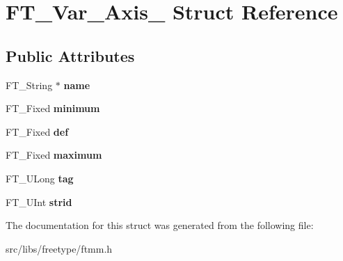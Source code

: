 \hypertarget{struct_f_t___var___axis__}{
\section{FT\_\-Var\_\-Axis\_\- Struct Reference}
\label{struct_f_t___var___axis__}
}
\subsection*{Public Attributes}
\begin{DoxyCompactItemize}
\item 
\hypertarget{struct_f_t___var___axis___a8d0e0af322a692999ec3733a3e18a5a4}{
FT\_\-String $\ast$ {\bfseries name}}
\label{struct_f_t___var___axis___a8d0e0af322a692999ec3733a3e18a5a4}

\item 
\hypertarget{struct_f_t___var___axis___aae13a8dea1c96bc3949019e8117e7edb}{
FT\_\-Fixed {\bfseries minimum}}
\label{struct_f_t___var___axis___aae13a8dea1c96bc3949019e8117e7edb}

\item 
\hypertarget{struct_f_t___var___axis___a37a6ca4188a6bfd95d9d06538bf1a3dd}{
FT\_\-Fixed {\bfseries def}}
\label{struct_f_t___var___axis___a37a6ca4188a6bfd95d9d06538bf1a3dd}

\item 
\hypertarget{struct_f_t___var___axis___a5704641439e9f318cf3c2b73864e3260}{
FT\_\-Fixed {\bfseries maximum}}
\label{struct_f_t___var___axis___a5704641439e9f318cf3c2b73864e3260}

\item 
\hypertarget{struct_f_t___var___axis___a01ef9396e34e740c2d2b8c7117094624}{
FT\_\-ULong {\bfseries tag}}
\label{struct_f_t___var___axis___a01ef9396e34e740c2d2b8c7117094624}

\item 
\hypertarget{struct_f_t___var___axis___a297d28ab0f5666e56d7575249ccc75d7}{
FT\_\-UInt {\bfseries strid}}
\label{struct_f_t___var___axis___a297d28ab0f5666e56d7575249ccc75d7}

\end{DoxyCompactItemize}


The documentation for this struct was generated from the following file:\begin{DoxyCompactItemize}
\item 
src/libs/freetype/ftmm.h\end{DoxyCompactItemize}
